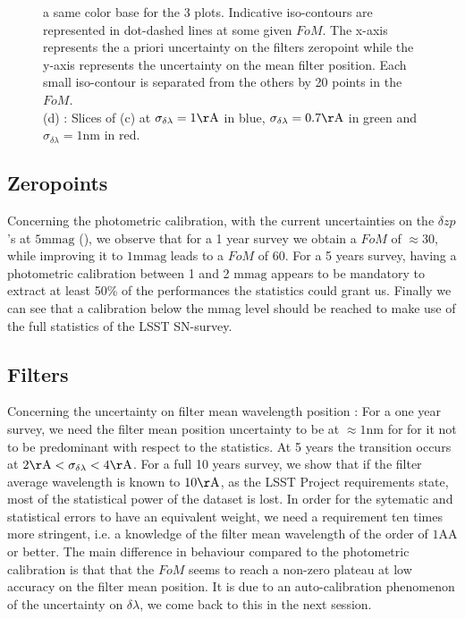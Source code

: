 \documentclass[\docopts]{\docclass}
\begin{document}
\begin{figure}[t]
\begin{center}
{  a same color base for the 3 plots. Indicative iso-contours are
  represented in dot-dashed lines at some given $FoM$. The x-axis
  represents the a priori uncertainty on the filters zeropoint while
  the y-axis represents the uncertainty on the mean filter
  position. Each small iso-contour is separated from the others by 20
  points in the $FoM$. \\ (d) : Slices of (c) at
  $\sigma_{\delta\lambda} = 1\mathrm{\AA}$ in
  blue, $\sigma_{\delta\lambda} = 0.7\mathrm{\AA}$ in green and
  $\sigma_{\delta\lambda} = 1\mathrm{nm}$ in red.}
\label{fig:fom_grids}
\end{center}
\end{figure}

\subsection{Zeropoints}
Concerning the photometric calibration, with the current uncertainties on the $\delta zp$'s at $5 \mathrm{mmag}$ (\cite{1401.4064}), we observe that for a 1 year survey we obtain a $FoM$ of $\approx 30$, while improving it to $1 \mathrm{mmag}$ leads to a $FoM$ of 60.
For a 5 years survey, having a photometric calibration between 1 and 2 $\mathrm{mmag}$ appears to be mandatory to extract at least 50\% of the performances the statistics could grant us.
Finally we can see that a calibration below the mmag level should be reached to make use of the full statistics of the LSST SN-survey.

\subsection{Filters}
Concerning the uncertainty on filter mean wavelength position : For a one year survey, we need the filter mean position uncertainty to be at  $\approx 1\mathrm{nm}$ for for it not to be predominant with respect to the statistics.
At 5 years the transition occurs at $2 \mathrm{\AA} < \sigma_{\delta\lambda} < 4 \mathrm{\AA}$.
For a full 10 years survey, we show that if the filter
average wavelength is known to $10 \mathrm{\AA}$, as the LSST Project requirements
state, most of the statistical power of the dataset is lost. In order
for the sytematic and statistical errors to have an equivalent
weight, we need a requirement ten times more stringent, i.e. a knowledge
of the filter mean wavelength of the order of $1 \mathrm{AA}$ or better.
The main difference in behaviour compared to the photometric calibration is that that the $FoM$ seems to reach a non-zero plateau at low accuracy on the filter mean position.
It is due to an auto-calibration phenomenon of the uncertainty on $\delta\lambda$, we come back to this in the next session.
\end{document}
